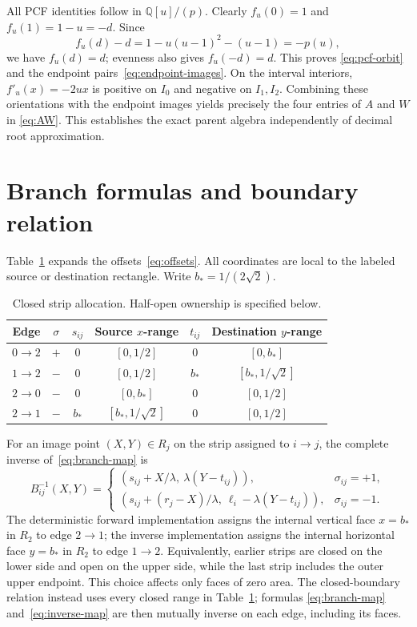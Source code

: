 \documentclass[11pt]{article}
\theoremstyle{definition}
\theoremstyle{remark}
\newcommand{\Q}{\mathbb{Q}}
\begin{document}
All PCF identities follow in \(\Q[u]/(p)\).  Clearly
\(f_u(0)=1\) and \(f_u(1)=1-u=-d\).  Since
\begin{equation}
 f_u(d)-d=1-u(u-1)^2-(u-1)=-p(u),
 \label{eq:pcf-reduction}
\end{equation}
we have \(f_u(d)=d\); evenness also gives \(f_u(-d)=d\).  This proves
\eqref{eq:pcf-orbit} and the endpoint pairs~\eqref{eq:endpoint-images}.
On the interval interiors, \(f'_u(x)=-2ux\) is positive on \(I_0\) and
negative on \(I_1,I_2\).  Combining these orientations with the endpoint
images yields precisely the four entries of \(A\) and \(W\) in
\eqref{eq:AW}.  This establishes the exact parent algebra independently of
decimal root approximation.

\section{Branch formulas and boundary relation}
\label{app:branches}

Table~\ref{tab:strips} expands the offsets~\eqref{eq:offsets}.  All
coordinates are local to the labeled source or destination rectangle.
Write \(b_*=1/(2\sqrt2)\).
\begin{table}[H]
\centering
\small
\caption{Closed strip allocation.  Half-open ownership is specified below.}
\label{tab:strips}
\begin{tabular}{cccccc}
\toprule
Edge & \(\sigma\) & \(s_{ij}\) & Source \(x\)-range & \(t_{ij}\) & Destination \(y\)-range \\
\midrule
\(0\to2\) & \(+\) & 0 & \([0,1/2]\) & 0 & \([0,b_*]\) \\
\(1\to2\) & \(-\) & 0 & \([0,1/2]\) & \(b_*\) & \([b_*,1/\sqrt2]\) \\
\(2\to0\) & \(-\) & 0 & \([0,b_*]\) & 0 & \([0,1/2]\) \\
\(2\to1\) & \(-\) & \(b_*\) & \([b_*,1/\sqrt2]\) & 0 & \([0,1/2]\) \\
\bottomrule
\end{tabular}
\end{table}

For an image point \((X,Y)\in R_j\) on the strip assigned to \(i\to j\),
the complete inverse of~\eqref{eq:branch-map} is
\begin{equation}
 B_{ij}^{-1}(X,Y)=
 \begin{cases}
 (s_{ij}+X/\lambda,\ \lambda(Y-t_{ij})),&\sigma_{ij}=+1,\\[2pt]
 (s_{ij}+(r_j-X)/\lambda,\ \ell_i-\lambda(Y-t_{ij})),&\sigma_{ij}=-1.
 \end{cases}
 \label{eq:inverse-map}
\end{equation}
The deterministic forward implementation assigns the internal vertical face
\(x=b_*\) in \(R_2\) to edge \(2\to1\); the inverse implementation assigns
the internal horizontal face \(y=b_*\) in \(R_2\) to edge \(1\to2\).
Equivalently, earlier strips are closed on the lower side and open on the
upper side, while the last strip includes the outer upper endpoint.  This
choice affects only faces of zero area.  The closed-boundary relation instead
uses every closed range in Table~\ref{tab:strips}; formulas
\eqref{eq:branch-map} and~\eqref{eq:inverse-map} are then mutually inverse on
each edge, including its faces.
\end{document}
